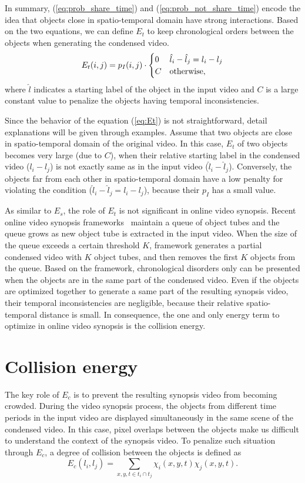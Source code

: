 \documentclass[11pt]{hyu_thesis}
\begin{document}
In summary, (\ref{eq:prob_share_time}) and (\ref{eq:prob_not_share_time}) encode the idea that objects close in spatio-temporal domain have strong interactions. Based on the two equations, we can define $E_t$ to keep chronological orders between the objects when generating the condensed video.
\begin{equation}
\label{eq:Et}
E_t(i,j)=
p_I(i, j) \cdot
\begin{cases}
0 & \hat{l}_i - \hat{l}_j = l_i - l_j \\
C & \rm{otherwise},
\end{cases}
\end{equation}
where $\hat{l}$ indicates a starting label of the object in the input video and $C$ is a large constant value to penalize the objects having temporal inconsistencies. 

Since the behavior of the equation (\ref{eq:Et}) is not straightforward, detail explanations will be given through examples. Assume that two objects are close in spatio-temporal domain of the original video. In this case, $E_t$ of two objects becomes very large (due to $C$), when their relative starting label in the condensed video ($l_i - l_j$) is not exactly same as in the input video ($\hat{l}_i - \hat{l}_j$). Conversely, the objects far from each other in spatio-temporal domain have a low penalty for violating the condition ($\hat{l}_i - \hat{l}_j = l_i - l_j$), because their $p_I$ has a small value.

As similar to $E_s$, the role of $E_t$ is not significant in online video synopsis. Recent online video synopsis frameworks~\cite{Fu2014,He2017} maintain a queue of object tubes and the queue grows as new object tube is extracted in the input video. When the size of the queue exceeds a certain threshold $K$, framework generates a partial condensed video with $K$ object tubes, and then removes the first $K$ objects from the queue. Based on the framework, chronological disorders only can be presented when the objects are in the same part of the condensed video. Even if the objects are optimized together to generate a same part of the resulting synopsis video, their temporal inconsistencies are negligible, because their relative spatio-temporal distance is small. In consequence, the one and only energy term to optimize in online video synopsis is the collision energy.

\section{Collision energy}
The key role of $E_c$ is to prevent the resulting synopsis video from becoming crowded. During the video synopsis process, the objects from different time periods in the input video are displayed simultaneously in the same scene of the condensed video. In this case, pixel overlaps between the objects make us difficult to understand the context of the synopsis video. To penalize such situation through $E_c$, a degree of collision between the objects is defined as
\begin{equation}
\label{eq:Ec}
E_c(l_i,l_j)=\sum_{x,y,t \in t_i \cap t_j} \chi_i(x,y,t) \chi_j(x,y,t).
\end{equation}
\end{document}
